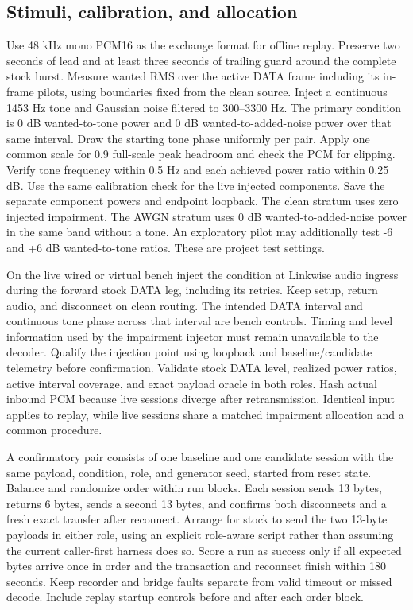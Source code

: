 \documentclass[11pt,a4paper]{article}
\begin{document}
\subsection{Stimuli, calibration, and allocation}
Use 48 kHz mono PCM16 as the exchange format for offline replay. Preserve two seconds of lead and at least three seconds of trailing guard around the complete stock burst. Measure wanted RMS over the active DATA frame including its in-frame pilots, using boundaries fixed from the clean source. Inject a continuous 1453 Hz tone and Gaussian noise filtered to 300--3300 Hz. The primary condition is 0 dB wanted-to-tone power and 0 dB wanted-to-added-noise power over that same interval. Draw the starting tone phase uniformly per pair. Apply one common scale for 0.9 full-scale peak headroom and check the PCM for clipping. Verify tone frequency within 0.5 Hz and each achieved power ratio within 0.25 dB. Use the same calibration check for the live injected components. Save the separate component powers and endpoint loopback. The clean stratum uses zero injected impairment. The AWGN stratum uses 0 dB wanted-to-added-noise power in the same band without a tone. An exploratory pilot may additionally test -6 and +6 dB wanted-to-tone ratios. These are project test settings.

On the live wired or virtual bench inject the condition at Linkwise audio ingress during the forward stock DATA leg, including its retries. Keep setup, return audio, and disconnect on clean routing. The intended DATA interval and continuous tone phase across that interval are bench controls. Timing and level information used by the impairment injector must remain unavailable to the decoder. Qualify the injection point using loopback and baseline/candidate telemetry before confirmation. Validate stock DATA level, realized power ratios, active interval coverage, and exact payload oracle in both roles. Hash actual inbound PCM because live sessions diverge after retransmission. Identical input applies to replay, while live sessions share a matched impairment allocation and a common procedure.

A confirmatory pair consists of one baseline and one candidate session with the same payload, condition, role, and generator seed, started from reset state. Balance and randomize order within run blocks. Each session sends 13 bytes, returns 6 bytes, sends a second 13 bytes, and confirms both disconnects and a fresh exact transfer after reconnect. Arrange for stock to send the two 13-byte payloads in either role, using an explicit role-aware script rather than assuming the current caller-first harness does so. Score a run as success only if all expected bytes arrive once in order and the transaction and reconnect finish within 180 seconds. Keep recorder and bridge faults separate from valid timeout or missed decode. Include replay startup controls before and after each order block.
\end{document}
